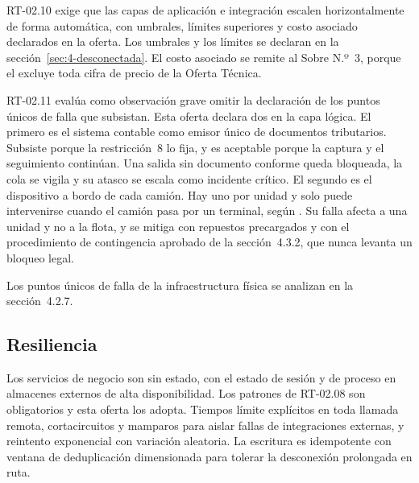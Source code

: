 RT-02.10 exige que las capas de aplicación e integración escalen horizontalmente de forma automática,
con umbrales, límites superiores y costo asociado declarados en la oferta. Los umbrales y los límites
se declaran en la sección~\ref{sec:4-desconectada}. El costo asociado se remite al Sobre N.º~3, porque
el  excluye toda cifra de precio de la Oferta Técnica.

RT-02.11 evalúa como observación grave omitir la declaración de los puntos únicos de falla que
subsistan. Esta oferta declara dos en la capa lógica. El primero es el sistema contable como emisor
único de documentos tributarios. Subsiste porque la restricción~8 lo fija, y es aceptable porque la
captura y el seguimiento continúan. Una salida sin documento conforme queda bloqueada, la cola se vigila
y su atasco se escala como incidente crítico. El segundo es el dispositivo a bordo de cada camión. Hay
uno por unidad y solo puede intervenirse cuando el camión pasa por un terminal, según
. Su falla afecta a una unidad y no a la flota, y se mitiga con repuestos
precargados y con el procedimiento de contingencia aprobado de la sección~4.3.2, que nunca levanta un
bloqueo legal.

Los puntos únicos de falla de la infraestructura física se analizan en la sección~4.2.7.

\subsection{Resiliencia}\label{sec:4-resiliencia}

Los servicios de negocio son sin estado, con el estado de sesión y de proceso en almacenes externos de
alta disponibilidad. Los patrones de RT-02.08 son obligatorios y esta oferta los adopta. Tiempos
límite explícitos en toda llamada remota, cortacircuitos y mamparos para aislar fallas de
integraciones externas, y reintento exponencial con variación aleatoria. La escritura es idempotente
con ventana de deduplicación dimensionada para tolerar la desconexión prolongada en ruta.

